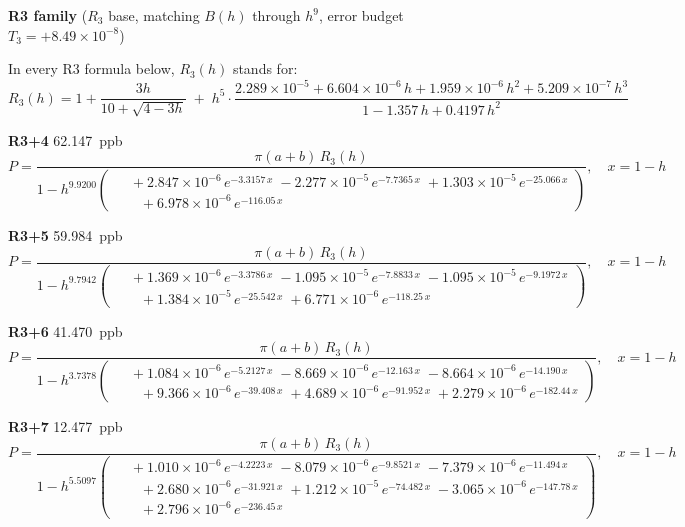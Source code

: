 \documentclass[12pt]{article}
\begin{document}
\small

\medskip\noindent\textbf{R3 family} ($R_3$ base, matching $B(h)$ through $h^9$, error budget $T_3 = +8.49 \times 10^{-8}$)\nopagebreak

\noindent In every R3 formula below, $R_3(h)$ stands for:
\[
R_3(h) = 1 + \frac{3h}{10+\sqrt{4{-}3h}}
  \;+\; h^5\!\cdot\!\frac{2.289{\times}10^{-5} + 6.604{\times}10^{-6}\,h + 1.959{\times}10^{-6}\,h^2 + 5.209{\times}10^{-7}\,h^3}
       {1 - 1.357\,h + 0.4197\,h^2}
\]

\noindent\textbf{R3+4} 62.147~ppb\nopagebreak
\begin{equation*}
P = \frac{\pi(a{+}b)\,R_3(h)}{1 - h^{9.9200}\!\left(\!\begin{aligned}
  &\; +2.847{\times}10^{-6}\,e^{-3.3157\,x} \; -2.277{\times}10^{-5}\,e^{-7.7365\,x} \; +1.303{\times}10^{-5}\,e^{-25.066\,x} \\[-3pt]
  &\quad +6.978{\times}10^{-6}\,e^{-116.05\,x}
\end{aligned}\!\right)}, \quad x = 1{-}h
\end{equation*}

\noindent\textbf{R3+5} 59.984~ppb\nopagebreak
\begin{equation*}
P = \frac{\pi(a{+}b)\,R_3(h)}{1 - h^{9.7942}\!\left(\!\begin{aligned}
  &\; +1.369{\times}10^{-6}\,e^{-3.3786\,x} \; -1.095{\times}10^{-5}\,e^{-7.8833\,x} \; -1.095{\times}10^{-5}\,e^{-9.1972\,x} \\[-3pt]
  &\quad +1.384{\times}10^{-5}\,e^{-25.542\,x} \; +6.771{\times}10^{-6}\,e^{-118.25\,x}
\end{aligned}\!\right)}, \quad x = 1{-}h
\end{equation*}

\noindent\textbf{R3+6} 41.470~ppb\nopagebreak
\begin{equation*}
P = \frac{\pi(a{+}b)\,R_3(h)}{1 - h^{3.7378}\!\left(\!\begin{aligned}
  &\; +1.084{\times}10^{-6}\,e^{-5.2127\,x} \; -8.669{\times}10^{-6}\,e^{-12.163\,x} \; -8.664{\times}10^{-6}\,e^{-14.190\,x} \\[-3pt]
  &\quad +9.366{\times}10^{-6}\,e^{-39.408\,x} \; +4.689{\times}10^{-6}\,e^{-91.952\,x} \; +2.279{\times}10^{-6}\,e^{-182.44\,x}
\end{aligned}\!\right)}, \quad x = 1{-}h
\end{equation*}

\noindent\textbf{R3+7} 12.477~ppb\nopagebreak
\begin{equation*}
P = \frac{\pi(a{+}b)\,R_3(h)}{1 - h^{5.5097}\!\left(\!\begin{aligned}
  &\; +1.010{\times}10^{-6}\,e^{-4.2223\,x} \; -8.079{\times}10^{-6}\,e^{-9.8521\,x} \; -7.379{\times}10^{-6}\,e^{-11.494\,x} \\[-3pt]
  &\quad +2.680{\times}10^{-6}\,e^{-31.921\,x} \; +1.212{\times}10^{-5}\,e^{-74.482\,x} \; -3.065{\times}10^{-6}\,e^{-147.78\,x} \\[-3pt]
  &\quad +2.796{\times}10^{-6}\,e^{-236.45\,x}
\end{aligned}\!\right)}, \quad x = 1{-}h
\end{equation*}
\end{document}
